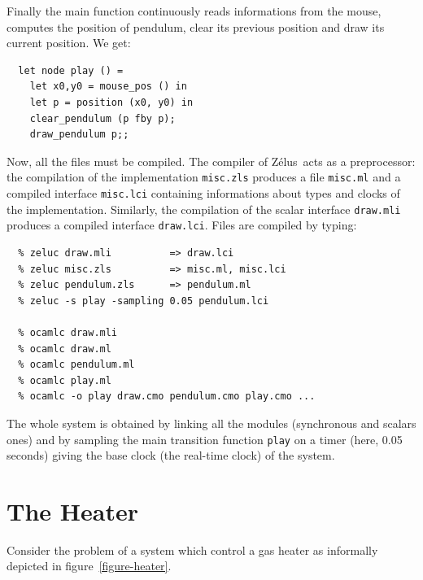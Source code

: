 \documentclass[11pt,titlepage,twoside]{report}
\newcommand{\zelus}{{\sf Z\'elus}}
\begin{document}
Finally the main function continuously reads
informations from the mouse, computes the position of pendulum, clear
its previous position and draw its current position. We get:

\begin{verbatim}
  let node play () =
    let x0,y0 = mouse_pos () in
    let p = position (x0, y0) in
    clear_pendulum (p fby p);
    draw_pendulum p;;
\end{verbatim}

Now, all the files must be compiled. The compiler of \zelus\ acts as a
preprocessor: the compilation of the implementation \verb-misc.zls-
produces a file \verb-misc.ml- and a compiled interface
\verb-misc.lci- containing informations about types and clocks of the
implementation. Similarly, the compilation of the scalar interface
\verb-draw.mli- produces a compiled interface \verb-draw.lci-. Files
are compiled by typing:

\begin{verbatim}
  % zeluc draw.mli          => draw.lci
  % zeluc misc.zls          => misc.ml, misc.lci
  % zeluc pendulum.zls      => pendulum.ml
  % zeluc -s play -sampling 0.05 pendulum.lci
  
  % ocamlc draw.mli
  % ocamlc draw.ml
  % ocamlc pendulum.ml
  % ocamlc play.ml
  % ocamlc -o play draw.cmo pendulum.cmo play.cmo ...
\end{verbatim}
The whole system is obtained by linking all the modules
(synchronous and scalars ones) and by sampling the main transition 
function \verb-play- on a timer (here, 0.05 seconds) giving the base
clock (the real-time clock) of the system.

\section{The Heater}
\label{heater}
Consider the problem of a system which control a gas heater as
informally depicted in figure~\ref{figure-heater}.
\end{document}
